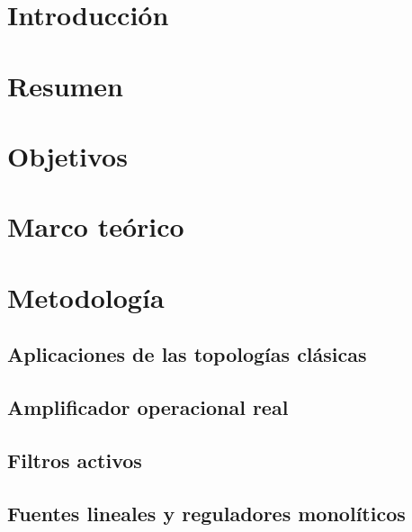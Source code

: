 \documentclass{article}
\begin{document}

\tableofcontents
\newpage
\section{Introducción}


\section{Resumen}


\section{Objetivos}


\section {Marco teórico}





\section{Metodología}
\subsection{Aplicaciones de las topologías clásicas}

\FloatBarrier
\subsection{Amplificador operacional real}

\FloatBarrier
\subsection{Filtros activos}

\FloatBarrier
\subsection{Fuentes lineales y reguladores monolíticos}

\end{document}
